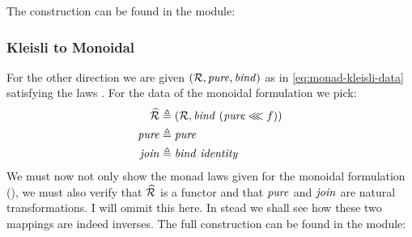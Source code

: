 %
The construction can be found in the module:
\begin{center}
\end{center}
%
\subsubsection{Kleisli to Monoidal}
For the other direction we are given $(\omapR, \pure, \bind)$ as in
\ref{eq:monad-kleisli-data} satisfying the laws \kleislilaws. For the data of
the monoidal formulation we pick:
%
\begin{align}
\begin{split}
    \EndoR & \defeq (\omapR, \bind\ (\pure \lll f)) \\
    \pure   & \defeq \pure \\
    \join   & \defeq \bind\ \identity
\end{split}
\end{align}
%
We must now not only show the monad laws given for the monoidal
formulation (\monoidallaws), we must also verify that $\widehat{\mathcal{R}}$ is a
functor and that $\pure$ and $\join$ are natural transformations. I
will ommit this here. In stead we shall see how these two mappings are
indeed inverses. The full construction can be found in the module:
\begin{center}
\mbox{}
\end{center}
%

